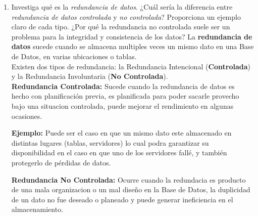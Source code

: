 \documentclass[12pt]{report}
\begin{document}
\begin{enumerate}[label=\textbf{\arabic*.}, leftmargin=*]
\begin{enumerate}[label=\textbf{\alph*.}, leftmargin=*, itemsep=1.0em]
\hspace{0.3cm}\textbf{Problemas:} 
Si careciera de esto básico, entonces estarían en peligro todos los datos almacenados estando expuestos a modificaciones o eliminaciones por parte de cualquier persona/usuario que tuviera conexión a la Base de Datos.

\textbf{Recuperación;}
Es posible que el SMBD cuente con la opción de restaurar o recuperar los datos de la Base de Datos en caso de que se hubiera presentado un problema mayor y resulte en la perdida de los datos. Es recomendado siempre tener un respaldo de todos los datos para evitar cualquier percance y tener un plan de respaldo.

\hspace{0.3cm}\textbf{Problemas:}
Si no existiera está función de recuperación, es posible que cuando se presente un problema relacionado a los datos, ya sea en la modificación de los datos, migración o incluso en la perdida total, no sería posible recuperar dichos datos almacenados que pudieran ser importantes.


\item Investiga qu\'e es la \textit{redundancia de datos}. ¿Cu\'al ser\'ia la diferencia entre \textit{redundancia de datos controlada} y \textit{no controlada}? Proporciona un ejemplo claro de cada tipo. ¿Por qu\'e la redundancia no controlada suele ser un problema para la integridad y consistencia de los datos?
La \textbf{redundancia de datos} sucede cuando se almacena multiples veces un mismo dato en una Base de Datos, en varias ubicaciones o tablas.\\
Existen dos tipos de redundancia: la Redundancia Intencional (\textbf{Controlada}) y la Redundancia Involuntaria (\textbf{No Controlada}).\\
\textbf{Redundancia Controlada:} Sucede cuando la redundancia de datos es hecho con planificación previa, es planificada para poder sacarle provecho bajo una situacion controlada, puede mejorar el rendimiento en algunas ocasiones.
 
 \hspace{0.3cm}\textbf{Ejemplo:} Puede ser el caso en que un mismo dato este almacenado en distintas lugares (tablas, servidores) lo cual podra garantizar su disponibilidad  en el caso en que uno de los servidores fallé, y también protegerlo de pérdidas de datos.

\textbf{Redundancia No Controlada:} Ocurre cuando la redundacia es producto de una mala organizacion o un mal diseño en la Base de Datos, la duplicidad de un dato no fue deseado o planeado y puede generar ineficiencia en el almacenamiento.


\end{enumerate}
\end{enumerate}
\end{document}
